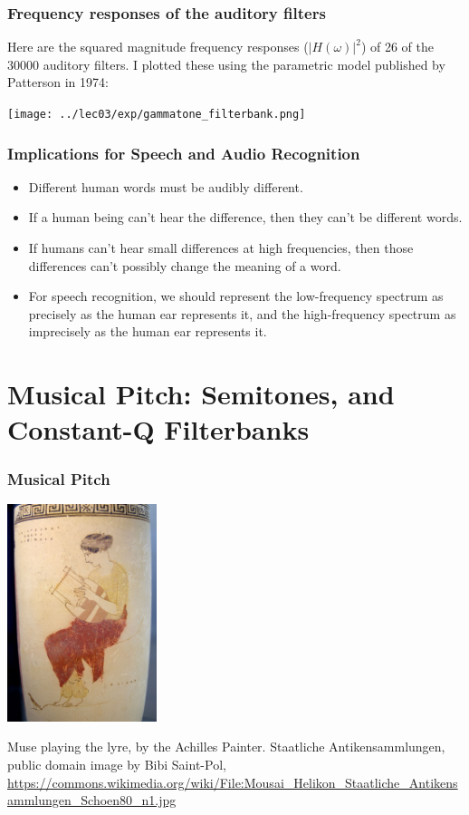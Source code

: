 \documentclass{beamer}
\begin{document}
\begin{frame}
  \frametitle{Frequency responses of the auditory filters}

  Here are the squared magnitude frequency responses ($|H(\omega)|^2$)
  of 26 of the 30000 auditory filters. I plotted these using the
  parametric model published by Patterson in 1974:
  \centerline{\texttt{[image: ../lec03/exp/gammatone\_filterbank.png]}}
\end{frame}

\begin{frame}
  \frametitle{Implications for Speech and Audio Recognition}

  \begin{itemize}
  \item Different human words must be audibly different.
  \item If a human being can't hear the difference, then they can't be different words.
  \item If humans can't hear small differences at high frequencies, then those differences
    can't possibly change the meaning of a word.
  \item For speech recognition, we should represent the low-frequency
    spectrum as precisely as the human ear represents it, and the
    high-frequency spectrum as imprecisely as the human ear represents
    it.
  \end{itemize}
\end{frame}

\section[Semitones]{Musical Pitch: Semitones, and Constant-Q Filterbanks}
\setcounter{subsection}{1}

\begin{frame}
  \frametitle{Musical Pitch}
  \centerline{\includegraphics[height=2.5in]{helikon.jpg}}
  \begin{tiny}
    Muse playing the lyre, by the Achilles Painter.  Staatliche
    Antikensammlungen, public domain image by Bibi Saint-Pol,
    \url{https://commons.wikimedia.org/wiki/File:Mousai_Helikon_Staatliche_Antikensammlungen_Schoen80_n1.jpg}
  \end{tiny}
\end{frame}
\end{document}
